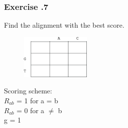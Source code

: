 %
%
\subsubsection*{Exercise \thesection.7}
	
Find the alignment with the best score.

\begin{multicols}{2}
\begin{figure}[H]
  \centering
      \includegraphics[width=0.3\textwidth]{fig02/back_tracking_exercise.png}
\end{figure}

\noindent Scoring scheme: \\ 
\null \quad $R_{ab}$ = 1 for a = b \\ 
\null \quad $R_{ab}$ = 0 for a $\neq$ b \\ 
\null \quad g = 1

\end{multicols} 

%
